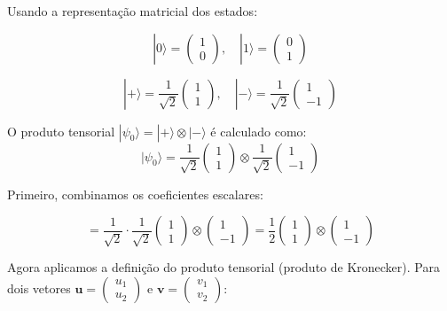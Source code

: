\documentclass[
  brazilian,
]{report}
\begin{document}
Usando a representação matricial dos estados:

\[|0\rangle = \begin{pmatrix} 1 \\ 0 \end{pmatrix}, \quad |1\rangle = \begin{pmatrix} 0 \\ 1 \end{pmatrix}\]

\[|+\rangle = \frac{1}{\sqrt{2}}\begin{pmatrix} 1 \\ 1 \end{pmatrix}, \quad |-\rangle = \frac{1}{\sqrt{2}}\begin{pmatrix} 1 \\ -1 \end{pmatrix}\]

O produto tensorial \(|\psi_0\rangle = |+\rangle \otimes |-\rangle\) é
calculado como:
\[|\psi_0\rangle = \frac{1}{\sqrt{2}}\begin{pmatrix} 1 \\ 1 \end{pmatrix} \otimes \frac{1}{\sqrt{2}}\begin{pmatrix} 1 \\ -1 \end{pmatrix}\]

Primeiro, combinamos os coeficientes escalares:

\[= \frac{1}{\sqrt{2}} \cdot \frac{1}{\sqrt{2}} \begin{pmatrix} 1 \\ 1 \end{pmatrix} \otimes \begin{pmatrix} 1 \\ -1 \end{pmatrix} = \frac{1}{2}\begin{pmatrix} 1 \\ 1 \end{pmatrix} \otimes \begin{pmatrix} 1 \\ -1 \end{pmatrix}\]

Agora aplicamos a definição do produto tensorial (produto de Kronecker).
Para dois vetores
\(\mathbf{u} = \begin{pmatrix} u_1 \\ u_2 \end{pmatrix}\) e
\(\mathbf{v} = \begin{pmatrix} v_1 \\ v_2 \end{pmatrix}\):
\end{document}
